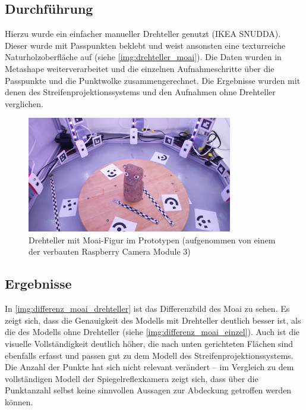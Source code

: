 \documentclass[./00PhotoBox.tex]{subfiles}
\begin{document}
\subsection{Durchführung}
Hierzu wurde ein einfacher manueller Drehteller genutzt (IKEA SNUDDA). Dieser wurde mit Passpunkten beklebt und weist ansonsten eine texturreiche Naturholzoberfläche auf (siehe \autoref{img:drehteller_moai}). Die Daten wurden in Metashape weiterverarbeitet und die einzelnen Aufnahmeschritte über die Passpunkte und die Punktwolke zusammengerechnet. Die Ergebnisse wurden mit denen des Streifenprojektionssystems und den Aufnahmen ohne Drehteller verglichen.

\begin{figure}[htbp]
    \centering
    \includegraphics[width=0.8\textwidth]{img/7_versuche/drehteller_moai.jpg}
    \caption{Drehteller mit Moai-Figur im Prototypen (aufgenommen von einem der verbauten Raspberry Camera Module 3)}
    \label{img:drehteller_moai}
\end{figure}

\subsection{Ergebnisse}

In \autoref{img:differenz_moai_drehteller} ist das Differenzbild des Moai zu sehen. Es zeigt sich, dass die Genauigkeit des Modells mit Drehteller deutlich besser ist, als die des Modells ohne Drehteller (siehe \autoref{img:differenz_moai_einzel}). Auch ist die visuelle Vollständigkeit deutlich höher, die nach unten gerichteten Flächen sind ebenfalls erfasst und passen gut zu dem Modell des Streifenprojektionssystems. Die Anzahl der Punkte hat sich nicht relevant verändert -- im Vergleich zu dem vollständigen Modell der Spiegelreflexkamera zeigt sich, dass über die Punktanzahl selbst keine sinnvollen Aussagen zur Abdeckung getroffen werden können.
\end{document}
